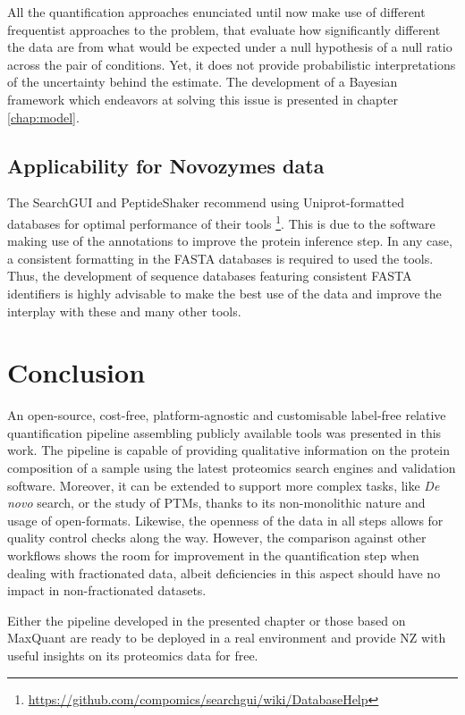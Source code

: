 All the quantification approaches enunciated until now make use of different frequentist approaches to the problem, that evaluate how significantly different the data are from what would be expected under a null hypothesis of a null ratio across the pair of conditions. Yet, it does not provide probabilistic interpretations of the uncertainty behind the estimate. The development of a Bayesian framework which endeavors at solving this issue is presented in chapter \ref{chap:model}.

\subsection{Applicability for Novozymes data}

The SearchGUI and PeptideShaker recommend using Uniprot-formatted databases for optimal performance of their tools \footnote{\href{https://github.com/compomics/searchgui/wiki/DatabaseHelp}{https://github.com/compomics/searchgui/wiki/DatabaseHelp}}. This is due to the software making use of the annotations to improve the protein inference step. In any case, a consistent formatting in the FASTA databases is required to used the tools. Thus, the development of sequence databases featuring consistent FASTA identifiers is highly advisable to make the best use of the data and improve the interplay with these and many other tools.


\section{Conclusion}

An open-source, cost-free, platform-agnostic and customisable label-free relative quantification pipeline assembling publicly available tools was presented in this work. The pipeline is capable of providing qualitative information on the protein composition of a sample using the latest proteomics search engines and validation software. Moreover, it can be extended to support more complex tasks, like \textit{De novo} search, or the study of \ac{PTM}s, thanks to its non-monolithic nature and usage of open-formats. Likewise, the openness of the data in all steps allows for quality control checks along the way. However, the comparison against other workflows shows the room for improvement in the quantification step when dealing with fractionated data, albeit deficiencies in this aspect should have no impact in non-fractionated datasets.

Either the pipeline developed in the presented chapter or those based on MaxQuant are ready to be deployed in a real environment and provide \ac{NZ} with useful insights on its proteomics data for free.